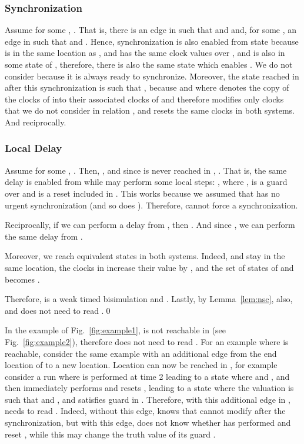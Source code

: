 \documentclass{LMCS}
\theoremstyle{plain}\newtheorem*{prop11}{Proposition~\ref{prop:states} bis}
\begin{document}
  \subsubsection*{Synchronization} Assume for some ,
  .
  That is, there is an edge
    in  such that 
  and  and,
  for some , an edge 
  in  such that  and .
  Hence, synchronization  is also enabled from state 
  because  is in the same location as , and has the same
  clock values over , and  is also in some state
  of , therefore, there is also the same state 
  which enables .
  We do not consider  because it is always ready to
  synchronize.
Moreover, the state reached in  after this synchronization is
   such that , because 
  and  where  denotes the copy of the
  clocks of  into their associated clocks of  and therefore  modifies
  only clocks that we do not consider in relation , and 
  resets the same clocks in both systems.
And reciprocally.

  \subsubsection*{Local Delay}
  Assume for some , .
  Then, \mbox{}, and since  is never reached
  in , .
  That is, the same delay is enabled from  while  may
  perform some local steps:
  ,
  where ,  is a guard over  and  is a reset
  included in .
  This works because we assumed that  has no urgent synchronization
  (and so does ).
  Therefore,  cannot force a synchronization.

  Reciprocally, if we can perform a delay  from , then
  .
And since
  ,
  we can perform the same delay from .

  Moreover, we reach equivalent states in both systems. Indeed,  and
   stay in the same location, the clocks in 
  increase their value by , and the set of states of  and  becomes
  .

  Therefore,  is a weak timed bisimulation and
  .
  Lastly, by Lemma~\ref{lem:nsc}, 
  also, and  does not need to read .\qed



In the example of Fig.~\ref{fig:example1},  is not reachable in
 (see Fig.~\ref{fig:example2}), therefore  does not need
to read .
For an example where  is reachable, consider the same example with an
additional edge  from the end location of 
to a new location. Location  can now be reached in ,
for example consider a run where  is performed at time 2 leading to a state
where  and , and then  immediately performs 
and resets , leading to a state where the valuation  is such that
 and , and satisfies guard  in
. Therefore, with this additional edge in , 
needs to read . Indeed, without this edge,  knows that 
cannot modify  after the synchronization, but with this edge,  does
not know whether  has performed  and reset , while this may
change the truth value of its guard .
\end{document}
